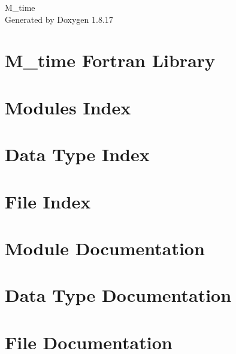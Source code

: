 \let\mypdfximage\pdfximage\def\pdfximage{\immediate\mypdfximage}\documentclass[twoside]{book}
\newcommand{\+}{\discretionary{\mbox{\scriptsize$\hookleftarrow$}}{}{}}
\newcommand{\clearemptydoublepage}{%
  \newpage{\pagestyle{empty}\cleardoublepage}%
}
\begin{document}
\hypersetup{pageanchor=false,
             bookmarksnumbered=true,
             pdfencoding=unicode
            }
\begin{titlepage}
\vspace*{7cm}
\begin{center}%
{\Large M\+\_\+time }\\
\vspace*{1cm}
{\large Generated by Doxygen 1.8.17}\\
\end{center}
\end{titlepage}
\clearemptydoublepage
{}
\tableofcontents
\clearemptydoublepage
{}
\hypersetup{pageanchor=true}

\chapter{M\+\_\+time Fortran Library}
\label{index}\hypertarget{index}{}
\chapter{Modules Index}

\chapter{Data Type Index}

\chapter{File Index}

\chapter{Module Documentation}


\chapter{Data Type Documentation}



\chapter{File Documentation}





\backmatter
\newpage
{}
\clearemptydoublepage
{}
\printindex
\end{document}
